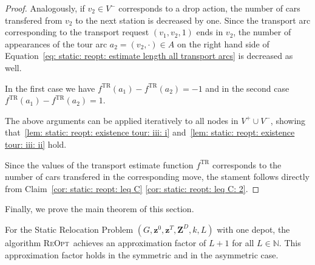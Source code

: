 \documentclass[english]{llncs}
\numberwithin{sublemma}{lemma}
\newcommand{\NN}{\ensuremath{\mathbb{N}}}
\newcommand{\capd}{\ensuremath{L}}
\newcommand{\TR}{\mathrm{TR}}
\newcommand{\z}{\boldsymbol{z}}
\newcommand{\zd}{\boldsymbol{Z}^D} \newcommand{\zzd}{Z^D}
\newcommand{\REOPT}{\textsc{ReOpt}\xspace}
\newcommand{\Vpick}{{V^+}}
\newcommand{\Vdrop}{{V^-}}
\begin{document}
\begin{proof}
Analogously, if $v_2 \in \Vdrop$ corresponds to a drop action, the number of cars transfered from $v_2$ to the next station is decreased by one.
Since the transport arc corresponding to the transport request $(v_1, v_2, 1)$ ends in $v_2$, the number of appearances of the tour arc $a_2 = (v_2, \cdot) \in A$
on the right hand side of Equation~\eqref{eq: static: reopt: estimate length all transport arcs} is decreased as well.

In the first case we have $f^{\TR}(a_1) - f^{\TR}(a_2) = -1$ and in the second case $f^{\TR}(a_1) - f^{\TR}(a_2) = 1$.

The above arguments can be applied iteratively to all nodes in $\Vpick \cup \Vdrop$, showing that~\ref{lem: static: reopt: existence tour: iii: i} and~\ref{lem: static: reopt: existence tour: iii: ii} hold.


Since the values of the transport estimate function $f^\TR$ corresponds to the number of cars transfered in the corresponding move,
the stament follows directly from Claim~\ref{cor: static: reopt: leq C} \ref{cor: static: reopt: leq C: 2}.
\end{proof}



Finally, we prove the main theorem of this section.


\begin{theorem} \label{thm: static: reopt: approximation factor: symmetric and asymmetric}
For the Static Relocation Problem $(G,\z^0,\z^T,\zd,k,L)$ with one depot,
the algorithm \REOPT\
achieves an approximation factor of $\capd + 1$ for all $\capd \in \NN$.
This approximation factor holds in the symmetric and in the asymmetric case.
\end{theorem}
\end{document}
